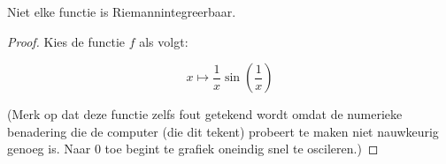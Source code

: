 \documentclass[main.tex]{subfiles}
\begin{document}
\begin{tvb}
  Niet elke functie is Riemannintegreerbaar.

  \begin{proof}
    Kies de functie $f$ als volgt:

    \noindent
    \begin{minipage}{.45\textwidth}
      \begin{figure}[H]
        \centering
      \end{figure}
    \end{minipage}
    \begin{minipage}{.45\textwidth}
      \[ x \mapsto \frac{1}{x}\sin\left(\frac{1}{x}\right) \]
    \end{minipage}

    \noindent(Merk op dat deze functie zelfs fout getekend wordt omdat de numerieke benadering die de computer (die dit tekent) probeert te maken niet nauwkeurig genoeg is. Naar $0$ toe begint te grafiek oneindig snel te oscileren.)
  \end{proof}
\end{tvb}
\end{document}

